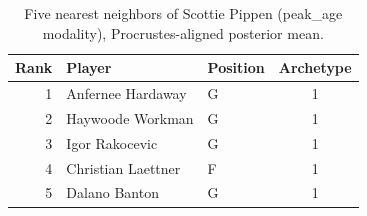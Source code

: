 \begin{table}[htbp]
  \centering\small
  \begin{tabular}{rllc}
    \toprule
    Rank & Player & Position & Archetype \\
    \midrule
    1 & Anfernee Hardaway & G & 1 \\
    2 & Haywoode Workman & G & 1 \\
    3 & Igor Rakocevic & G & 1 \\
    4 & Christian Laettner & F & 1 \\
    5 & Dalano Banton & G & 1 \\
    \bottomrule
  \end{tabular}
  \caption{Five nearest neighbors of Scottie Pippen (peak_age modality), Procrustes-aligned posterior mean.}
  \label{tab:Scottie_Pippen_neighbors_peak_age}
\end{table}

